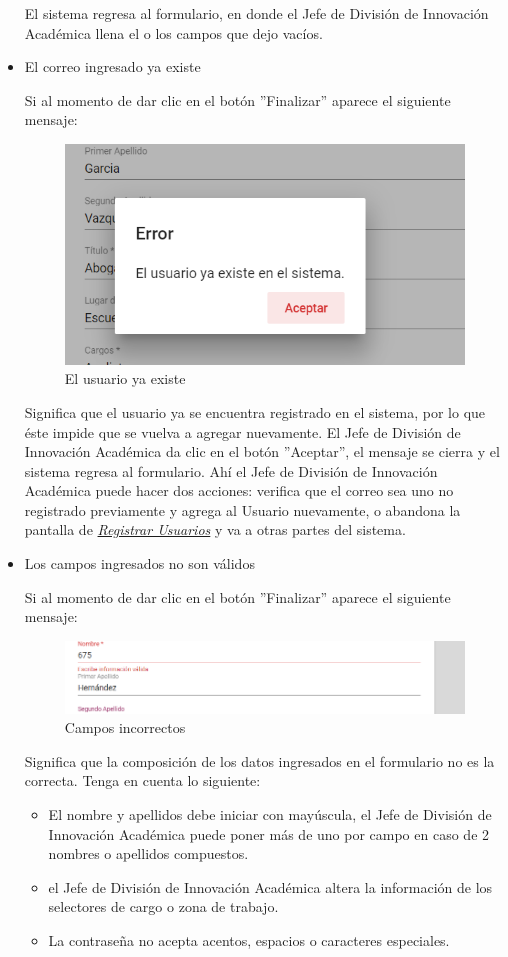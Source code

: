 \begin{itemize}
	El sistema regresa  al formulario, en donde el Jefe de División de Innovación Académica  llena el o los campos que dejo vacíos.
	\item El correo ingresado ya existe
	
	Si al momento de dar clic en el botón ''Finalizar'' aparece el siguiente mensaje:
	
	\begin{figure}[H]
		\centering
		\includegraphics[width=0.4\linewidth]{images/SP5/MSG36}
		\caption{El usuario ya existe}
		\label{mensaje36}
		
	\end{figure}
	
	Significa que el usuario ya se encuentra registrado en el sistema, por lo que éste impide que se vuelva a agregar nuevamente. El Jefe de División de Innovación Académica  da clic en el botón ''Aceptar'', el mensaje se cierra y el sistema regresa al formulario. Ahí el Jefe de División de Innovación Académica  puede hacer dos acciones: verifica que el correo sea uno no registrado previamente y agrega al Usuario nuevamente, o abandona la pantalla de \hyperlink{registrarUs}{\textit{Registrar Usuarios}} y va a otras partes del sistema.
	
	\item Los campos ingresados no son válidos
	
	Si al momento de dar clic en el botón ''Finalizar'' aparece el siguiente mensaje:
	\clearpage
	\begin{figure}[H]
		\centering
		\includegraphics[width=0.4\linewidth]{images/SP5/MSG35}
		\caption{Campos incorrectos}
		\label{mensaje35}
		
	\end{figure}
	
	
	Significa que la composición de los datos ingresados en el formulario no es la correcta. Tenga en cuenta lo siguiente:
	
	\begin{itemize}
		\item El nombre y apellidos debe iniciar con mayúscula, el Jefe de División de Innovación Académica  puede poner más de uno por campo en caso de 2 nombres o apellidos compuestos.
		\item el Jefe de División de Innovación Académica  altera la información de los selectores de cargo o zona de trabajo.
		\item La contraseña no acepta acentos, espacios o caracteres especiales.
	\end{itemize}
\end{itemize}